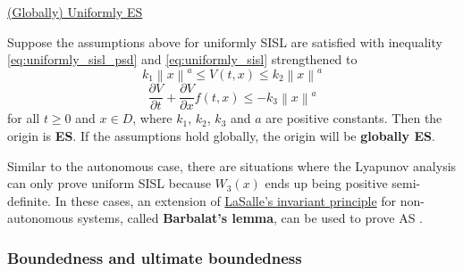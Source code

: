 \begin{theorem}
  \underline{(Globally) Uniformly ES}

  Suppose the assumptions above for uniformly SISL are satisfied with inequality \eqref{eq:uniformly_sisl_psd} and \eqref{eq:uniformly_sisl} strengthened to
  \begin{equation}
    k_1\left\|x\right\|^a \leq V\left(t, x\right) \leq k_2 \left\|x\right\|^a
  \end{equation}
  \begin{equation}
    \frac{\partial V}{\partial t}+\frac{\partial V}{\partial x} f \left( t, x \right)\le - k_3 \left\|x\right\|^a
  \end{equation}
  for all $t \geq 0$ and $x \in D$, where $k_1$, $k_2$, $k_3$ and $a$ are positive constants. Then the origin is \textbf{ES}. If the assumptions hold globally, the origin will be \textbf{globally ES}.
\end{theorem}

Similar to the autonomous case, there are situations where the Lyapunov analysis can only prove uniform SISL because $W_3 \left( x \right)$ ends up being positive semi-definite. In these cases, an extension of \hyperref[th:lasalles]{LaSalle's invariant principle} for non-autonomous systems, called \textbf{Barbalat's lemma}, can be used to prove AS \cite{khalilNonlinearSystems2002}.

\subsubsection{Boundedness and ultimate boundedness}

